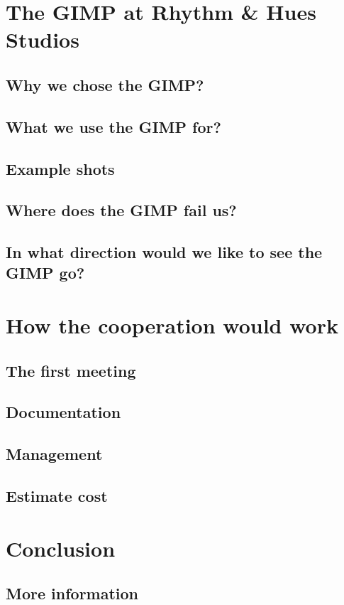 \documentclass{report}
\begin{document}
\chapter{The GIMP at Rhythm \& Hues Studios}

\section{Why we chose the GIMP?}

\section{What we use the GIMP for?}

\section{Example shots}

\section{Where does the GIMP fail us?}

\section{In what direction would we like to see the GIMP go?} 


\chapter{How the cooperation would work}

\section{The first meeting}
\section{Documentation}
\section{Management}
\section{Estimate cost}

\chapter{Conclusion}

\section{More information}

{
\small


}



\end{document}
